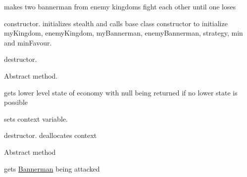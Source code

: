 \begin{DoxyRefList}
%
makes two bannerman from enemy kingdoms fight each other until one loses  
\item[Member \mbox{\hyperlink{class_siege_a58bf6483aa888973ab9ead36635234fc}{Siege\+::Siege}} (int stealth, int min, int min\+Favour)]\label{todo__todo000016}%
%
constructor. initializes stealth and calls base class constructor to initialize my\+Kingdom, enemy\+Kingdom, my\+Bannerman, enemy\+Bannerman, strategy, min and min\+Favour.  
\item[Member \mbox{\hyperlink{class_siege_aac2d09fe50a26b39865aad8c8c9486b9}{Siege\+::$\sim$\+Siege}} ()]\label{todo__todo000018}%
%
destructor.  
\item[Member \mbox{\hyperlink{class_state_a5773daf54efd2c1e6723950d4e44b5a7}{State\+::decrease\+Currency}} ()=0]\label{todo__todo000020}%
%
Abstract method.  
\item[Member \mbox{\hyperlink{class_state_aa901c36d20da2a396e4fa27bf8576eec}{State\+::get\+Demotion\+State}} ()]\label{todo__todo000021}%
%
gets lower level state of economy with null being returned if no lower state is possible  
\item[Member \mbox{\hyperlink{class_state_ae8c1972e00c66761620cf9c3d4d8cb49}{State\+::set\+Context}} (\mbox{\hyperlink{class_economy}{Economy}} $\ast$context)]\label{todo__todo000019}%
%
sets context variable.  
\item[Member \mbox{\hyperlink{class_state_afab438d92b90dc18d194dbd9c9c8bab3}{State\+::$\sim$\+State}} ()]\label{todo__todo000022}%
%
destructor. deallocates context  
\item[Member \mbox{\hyperlink{class_strategy_adecf5b4398ec2dd89bd280441f674de3}{Strategy\+::attack}} (\mbox{\hyperlink{class_bannerman}{Bannerman}} $\ast$my\+Bannerman, \mbox{\hyperlink{class_bannerman}{Bannerman}} $\ast$enemy\+Bannerman)=0]\label{todo__todo000024}%
%
Abstract method  
\item[Member \mbox{\hyperlink{class_strategy_a88ed4a64031030f3a9a30652b01debe6}{Strategy\+::get\+Enemy\+Bannerman}} ()]\label{todo__todo000027}%
%
gets \mbox{\hyperlink{class_bannerman}{Bannerman}} being attacked  
\item[Member \mbox{\hyperlink{class_strategy_a0931adab8a2fe9b3cf68bbd626e10b3a}{Strategy\+::get\+My\+Bannerman}} ()]\label{todo__todo000026}%

\end{DoxyRefList}
